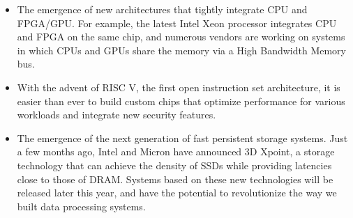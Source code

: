 \documentclass [10pt]{article}
\begin{document}
\begin{outline}
\begin{itemize}[noitemsep,topsep=0pt,parsep=0pt,partopsep=0pt]
\item The emergence of new architectures that tightly integrate CPU and FPGA/GPU. For example, the latest Intel Xeon processor integrates CPU and FPGA on the same chip, and numerous vendors are working on systems in which  CPUs and GPUs share the memory via a High Bandwidth Memory bus.  

\item With the advent of RISC V, the first open instruction set architecture, it is easier than ever to build custom chips that optimize performance for various workloads and integrate new security features.

\item The emergence of the next generation of fast persistent storage systems. Just a few months ago, Intel and Micron have announced 3D Xpoint, a storage technology that can achieve the density of SSDs while providing latencies close to those of DRAM. Systems based on these new technologies will be released later this year, and have the potential to revolutionize the way we built data processing systems.
\end{itemize}













\newpage
\pagestyle{plain}

\setcounter{page}{1}


 


\newpage
\pagestyle{plain}

\setcounter{page}{1}

%

\end{outline}
\end{document}
